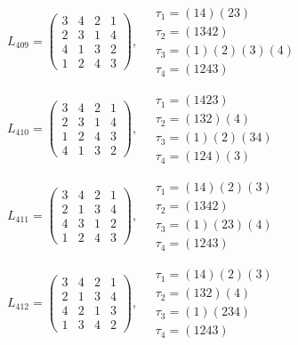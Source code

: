 $L_{409} = \begin{pmatrix} 3 & 4 & 2 & 1 \\ 2 & 3 & 1 & 4 \\ 4 & 1 & 3 & 2 \\ 1 & 2 & 4 & 3 \end{pmatrix}, \quad \begin{matrix} \tau_{1} = (1 4)(2 3) \\ \tau_{2} = (1 3 4 2) \\ \tau_{3} = (1)(2)(3)(4) \\ \tau_{4} = (1 2 4 3) \end{matrix}$

$L_{410} = \begin{pmatrix} 3 & 4 & 2 & 1 \\ 2 & 3 & 1 & 4 \\ 1 & 2 & 4 & 3 \\ 4 & 1 & 3 & 2 \end{pmatrix}, \quad \begin{matrix} \tau_{1} = (1 4 2 3) \\ \tau_{2} = (1 3 2)(4) \\ \tau_{3} = (1)(2)(3 4) \\ \tau_{4} = (1 2 4)(3) \end{matrix}$

$L_{411} = \begin{pmatrix} 3 & 4 & 2 & 1 \\ 2 & 1 & 3 & 4 \\ 4 & 3 & 1 & 2 \\ 1 & 2 & 4 & 3 \end{pmatrix}, \quad \begin{matrix} \tau_{1} = (1 4)(2)(3) \\ \tau_{2} = (1 3 4 2) \\ \tau_{3} = (1)(2 3)(4) \\ \tau_{4} = (1 2 4 3) \end{matrix}$

$L_{412} = \begin{pmatrix} 3 & 4 & 2 & 1 \\ 2 & 1 & 3 & 4 \\ 4 & 2 & 1 & 3 \\ 1 & 3 & 4 & 2 \end{pmatrix}, \quad \begin{matrix} \tau_{1} = (1 4)(2)(3) \\ \tau_{2} = (1 3 2)(4) \\ \tau_{3} = (1)(2 3 4) \\ \tau_{4} = (1 2 4 3) \end{matrix}$

